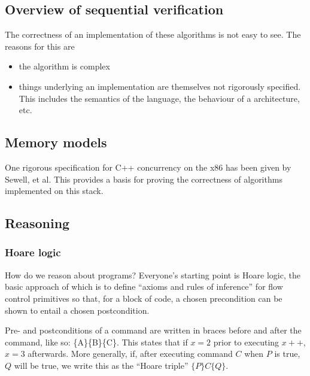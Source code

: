 \subsection{Overview of sequential verification}

The correctness of an implementation of these algorithms is not easy to see.
The reasons for this are

\begin{itemize}

\item the algorithm is complex

\item
things underlying an implementation
  are themselves not rigorously specified.
This includes the semantics of the language, the behaviour of a architecture, etc.

\end{itemize}

\subsection{Memory models}

One rigorous specification for C++ concurrency on the x86
  has been given by Sewell, et al.
This provides a basis for
  proving the correctness of algorithms implemented on this stack.

\subsection{Reasoning}

\subsubsection{Hoare logic}

How do we reason about programs?
Everyone's starting point is Hoare logic,\cite{hoare}
  the basic approach of which is to
  define \enquote{axioms and rules of inference} for flow control primitives
  so that, for a block of code,
  a chosen precondition can be shown to entail a chosen postcondition.

Pre- and postconditions of a command are
  written in braces before and after the command, like so:
  \{A\}\{B\}\{C\}.
This states that
    if $x=2$ prior to executing $x++$,
    $x=3$ afterwards.
More generally,
  if, after executing command $C$ when $P$ is true, $Q$ will be true,
  we write this as the \enquote{Hoare triple} $\{P\} C \{Q\}$.\footnotemark



